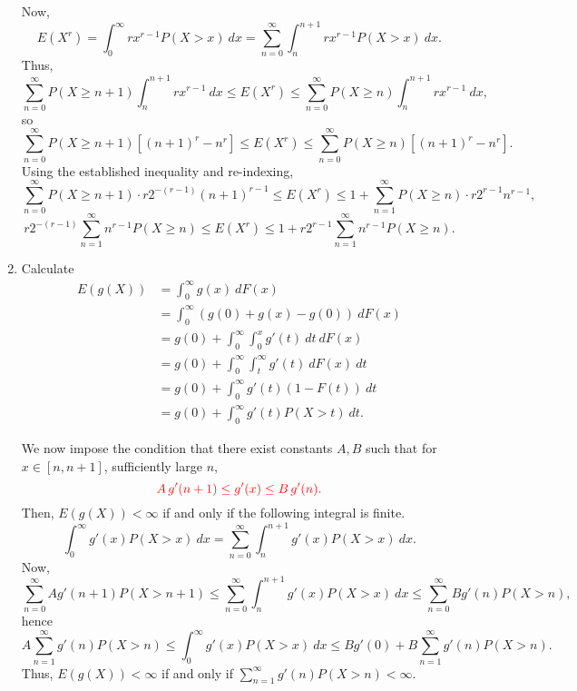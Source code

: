 \documentclass[10pt]{article}
\begin{document}
\begin{enumerate}
        Now, \[
            E(X^r) = \int_0^\infty r x^{r - 1} P(X > x) \:dx = \sum_{n = 0}^\infty
            \int_n^{n + 1} rx^{r - 1} P(X > x) \:dx.
        \] Thus, \[
            \sum_{n = 0}^\infty P(X \geq n + 1) \int_n^{n + 1} rx^{r - 1}\:dx
            \leq E(X^r)
            \leq \sum_{n = 0}^\infty P(X \geq n) \int_n^{n + 1} rx^{r - 1}\:dx,
        \] so \[
            \sum_{n = 0}^\infty P(X \geq n + 1) [(n + 1)^r - n^r]
            \leq E(X^r)
            \leq \sum_{n = 0}^\infty P(X \geq n) [(n + 1)^r - n^r].
        \] Using the established inequality and re-indexing, \[
            \sum_{n = 0}^\infty P(X \geq n + 1)\cdot r2^{-(r - 1)}(n + 1)^{r - 1}
            \leq E(X^r)
            \leq 1 + \sum_{n = 1}^\infty P(X \geq n)\cdot r2^{r - 1}n^{r - 1},
        \] \[
            r2^{-(r - 1)} \sum_{n = 1}^\infty n^{r - 1} P(X \geq n)
            \leq E(X^r)
            \leq 1 + r2^{r - 1}\sum_{n = 1}^\infty n^{r - 1} P(X \geq n).
        \]


        \item Calculate \begin{align*}
            E(g(X)) &= \int_0^\infty g(x) \:dF(x) \\
            &= \int_0^\infty (g(0) + g(x) - g(0)) \:dF(x) \\
            &= g(0) + \int_0^\infty \int_0^x g'(t) \:dt \:dF(x) \\
            &= g(0) + \int_0^\infty \int_t^\infty g'(t) \:dF(x) \:dt \\
            &= g(0) + \int_0^\infty g'(t) (1 - F(t)) \:dt \\
            &= g(0) + \int_0^\infty g'(t) P(X > t) \:dt.
        \end{align*}

        We now impose the condition that there exist constants $A, B$ such that for
        $x \in [n, n + 1]$, sufficiently large $n$, \[
            \textcolor{red}{A\,g'(n + 1) \leq g'(x) \leq B\,g'(n).}
        \] Then, $E(g(X)) < \infty$ if and only if the following integral is finite.
        \[
            \int_0^\infty g'(x) P(X > x) \:dx = \sum_{n = 0}^\infty \int_n^{n + 1}
            g'(x) P(X > x) \:dx.
        \] Now, \[
            \sum_{n = 0}^\infty A g'(n + 1) P(X > n + 1) \leq
            \sum_{n = 0}^\infty \int_n^{n + 1} g'(x) P(X > x) \:dx \leq
            \sum_{n = 0}^\infty B g'(n) P(X > n),
        \] hence \[
            A \sum_{n = 1}^\infty g'(n) P(X > n) \leq
            \int_0^\infty g'(x) P(X > x) \:dx \leq
            B g'(0) + B \sum_{n = 1}^\infty g'(n) P(X > n).
        \] Thus, $E(g(X)) < \infty$ if and only if $\sum_{n = 1}^\infty g'(n) P(X >
        n) < \infty$.


\end{enumerate}
\end{document}
